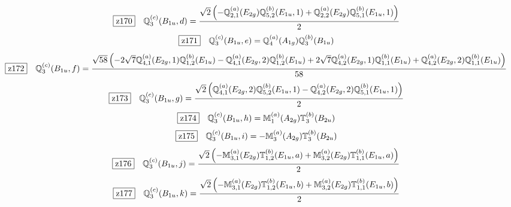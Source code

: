 \documentclass[fleqn,10pt,landscape]{jsarticle}
\begin{document}
\begin{dmath*}
\hspace*{3mm}\fbox{z170}\quad \mathbb{Q}_{3}^{(c)}(B_{1u},d)=\frac{\sqrt{2} \left(- \mathbb{Q}_{2,1}^{(a)}(E_{2g}) \mathbb{Q}_{5,2}^{(b)}(E_{1u},1) + \mathbb{Q}_{2,2}^{(a)}(E_{2g}) \mathbb{Q}_{5,1}^{(b)}(E_{1u},1)\right)}{2}
\end{dmath*}
\begin{dmath*}
\hspace*{3mm}\fbox{z171}\quad \mathbb{Q}_{3}^{(c)}(B_{1u},e)=\mathbb{Q}_{4}^{(a)}(A_{1g}) \mathbb{Q}_{3}^{(b)}(B_{1u})
\end{dmath*}
\begin{dmath*}
\hspace*{3mm}\fbox{z172}\quad \mathbb{Q}_{3}^{(c)}(B_{1u},f)=\frac{\sqrt{58} \left(- 2 \sqrt{7} \mathbb{Q}_{4,1}^{(a)}(E_{2g},1) \mathbb{Q}_{1,2}^{(b)}(E_{1u}) - \mathbb{Q}_{4,1}^{(a)}(E_{2g},2) \mathbb{Q}_{1,2}^{(b)}(E_{1u}) + 2 \sqrt{7} \mathbb{Q}_{4,2}^{(a)}(E_{2g},1) \mathbb{Q}_{1,1}^{(b)}(E_{1u}) + \mathbb{Q}_{4,2}^{(a)}(E_{2g},2) \mathbb{Q}_{1,1}^{(b)}(E_{1u})\right)}{58}
\end{dmath*}
\begin{dmath*}
\hspace*{3mm}\fbox{z173}\quad \mathbb{Q}_{3}^{(c)}(B_{1u},g)=\frac{\sqrt{2} \left(\mathbb{Q}_{4,1}^{(a)}(E_{2g},2) \mathbb{Q}_{5,2}^{(b)}(E_{1u},1) - \mathbb{Q}_{4,2}^{(a)}(E_{2g},2) \mathbb{Q}_{5,1}^{(b)}(E_{1u},1)\right)}{2}
\end{dmath*}
\begin{dmath*}
\hspace*{3mm}\fbox{z174}\quad \mathbb{Q}_{3}^{(c)}(B_{1u},h)=\mathbb{M}_{1}^{(a)}(A_{2g}) \mathbb{T}_{3}^{(b)}(B_{2u})
\end{dmath*}
\begin{dmath*}
\hspace*{3mm}\fbox{z175}\quad \mathbb{Q}_{3}^{(c)}(B_{1u},i)=- \mathbb{M}_{3}^{(a)}(A_{2g}) \mathbb{T}_{3}^{(b)}(B_{2u})
\end{dmath*}
\begin{dmath*}
\hspace*{3mm}\fbox{z176}\quad \mathbb{Q}_{3}^{(c)}(B_{1u},j)=\frac{\sqrt{2} \left(- \mathbb{M}_{3,1}^{(a)}(E_{2g}) \mathbb{T}_{1,2}^{(b)}(E_{1u},a) + \mathbb{M}_{3,2}^{(a)}(E_{2g}) \mathbb{T}_{1,1}^{(b)}(E_{1u},a)\right)}{2}
\end{dmath*}
\begin{dmath*}
\hspace*{3mm}\fbox{z177}\quad \mathbb{Q}_{3}^{(c)}(B_{1u},k)=\frac{\sqrt{2} \left(- \mathbb{M}_{3,1}^{(a)}(E_{2g}) \mathbb{T}_{1,2}^{(b)}(E_{1u},b) + \mathbb{M}_{3,2}^{(a)}(E_{2g}) \mathbb{T}_{1,1}^{(b)}(E_{1u},b)\right)}{2}
\end{dmath*}
\end{document}
